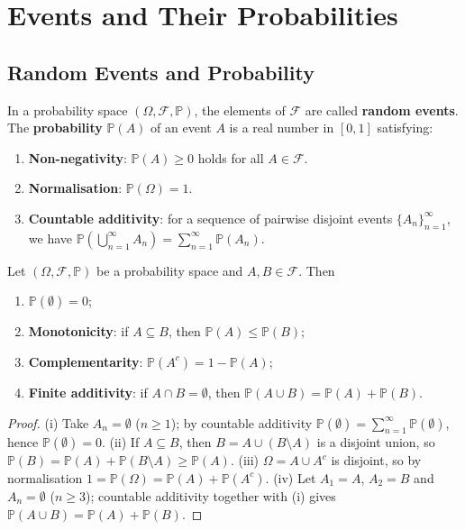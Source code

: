 \section{Events and Their Probabilities}\label{sec:events_probability}

\subsection{Random Events and Probability}

\begin{definition}\label{def:random_event}
In a probability space $(\Omega, \mathcal{F}, \mathbb{P})$, the elements of $\mathcal{F}$ are called \textbf{random events}. The \textbf{probability} $\mathbb{P}(A)$ of an event $A$ is a real number in $[0,1]$ satisfying:
\begin{enumerate}[label=(\roman*)]
    \item \textbf{Non-negativity}: $\mathbb{P}(A) \ge 0$ holds for all $A \in \mathcal{F}$.
    \item \textbf{Normalisation}: $\mathbb{P}(\Omega) = 1$.
    \item \textbf{Countable additivity}: for a sequence of pairwise disjoint events $\{A_n\}_{n=1}^{\infty}$, we have $\mathbb{P}(\bigcup_{n=1}^{\infty} A_n) = \sum_{n=1}^{\infty} \mathbb{P}(A_n)$.
\end{enumerate}
\end{definition}

\begin{proposition}\label{prop:probability_measure_properties}
Let $(\Omega, \mathcal{F}, \mathbb{P})$ be a probability space and $A, B \in \mathcal{F}$. Then
\begin{enumerate}[label=(\roman*)]
    \item $\mathbb{P}(\emptyset) = 0$;
    \item \textbf{Monotonicity}: if $A \subseteq B$, then $\mathbb{P}(A) \le \mathbb{P}(B)$;
    \item \textbf{Complementarity}: $\mathbb{P}(A^c) = 1 - \mathbb{P}(A)$;
    \item \textbf{Finite additivity}: if $A \cap B = \emptyset$, then $\mathbb{P}(A \cup B) = \mathbb{P}(A) + \mathbb{P}(B)$.
\end{enumerate}
\end{proposition}

\begin{proof}
(i) Take $A_n = \emptyset$ ($n \ge 1$); by countable additivity $\mathbb{P}(\emptyset) = \sum_{n=1}^{\infty}\mathbb{P}(\emptyset)$, hence $\mathbb{P}(\emptyset) = 0$.
(ii) If $A \subseteq B$, then $B = A \cup (B \setminus A)$ is a disjoint union, so $\mathbb{P}(B) = \mathbb{P}(A) + \mathbb{P}(B \setminus A) \ge \mathbb{P}(A)$.
(iii) $\Omega = A \cup A^c$ is disjoint, so by normalisation $1 = \mathbb{P}(\Omega) = \mathbb{P}(A) + \mathbb{P}(A^c)$.
(iv) Let $A_1 = A$, $A_2 = B$ and $A_n = \emptyset$ ($n \ge 3$); countable additivity together with (i) gives $\mathbb{P}(A \cup B) = \mathbb{P}(A) + \mathbb{P}(B)$.
\end{proof}

